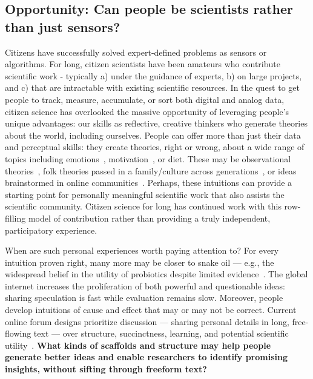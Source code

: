 
\subsection{Opportunity: Can people be scientists rather than just sensors?}
Citizens have successfully solved expert-defined problems as sensors or algorithms. For long, citizen scientists have been amateurs who contribute scientific work - typically a) under the guidance of experts, b)  on large projects, and c) that are intractable with existing scientific resources.
In the quest to get people to track, measure, accumulate, or
sort both digital and analog data, citizen science has overlooked the massive 
opportunity of leveraging people’s unique advantages: our skills as reflective, 
creative thinkers who generate theories about the world, including ourselves.
People can offer more than just their data and perceptual
skills: they create theories, right or wrong, about a wide
range of topics including emotions~\cite{Johnson-Laird1992a}, motivation~\cite{Markus1991}, or
diet. These may be observational theories~\cite{Kempton1986}, folk theories
passed in a family/culture across generations~\cite{Gelman2011}, or ideas
brainstormed in online communities~\cite{23andme2016}. Perhaps, these intuitions 
can provide a starting point for personally meaningful scientific work that also assists the scientific community.
Citizen science for long has continued work with this row-filling model of contribution rather than providing a truly independent, participatory experience. 

When are such personal experiences worth paying attention
to? For every intuition proven right, many more may be
closer to snake oil — e.g., the widespread belief in the utility
of probiotics despite limited evidence~\cite{Bonifait2009}. The global internet
increases the proliferation of both powerful and questionable
ideas: sharing speculation is fast while evaluation remains
slow. Moreover, people develop intuitions of cause and effect
that may or may not be correct. Current online forum
designs prioritize discussion — sharing personal details in
long, free-flowing text — over structure, succinctness, learning,
and potential scientific utility~\cite{Thomas2002}. \textbf{What kinds of scaffolds
and structure may help people generate better ideas and
enable researchers to identify promising insights, without
sifting through freeform text?}


